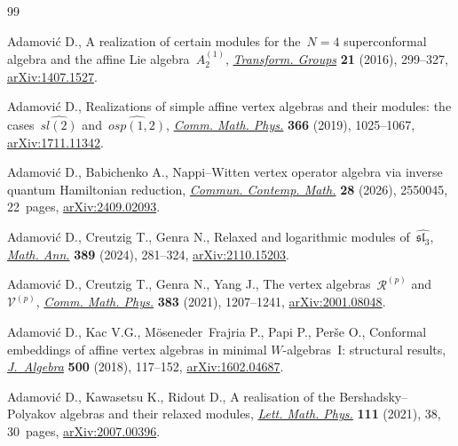 \documentclass[10pt,a4paper]{amsart}
\numberwithin{equation}{section}
\begin{document}
\begin{thebibliography}{99}
\footnotesize\itemsep=0pt

Adamovi\'c D., A realization of certain modules for the~{$N=4$} superconformal
 algebra and the affine {L}ie algebra~{$A_2^{(1)}$},
 \href{https://doi.org/10.1007/s00031-015-9349-2}{\textit{Transform. Groups}}
 \textbf{21} (2016), 299--327,
 \href{http://arxiv.org/abs/1407.1527}{arXiv:1407.1527}.

Adamovi\'c D., Realizations of simple affine vertex algebras and their modules:
 the cases~{$\widehat{sl(2)}$} and~{$\widehat{osp(1,2)}$},
 \href{https://doi.org/10.1007/s00220-019-03328-4}{\textit{Comm. Math. Phys.}}
 \textbf{366} (2019), 1025--1067,
 \href{http://arxiv.org/abs/1711.11342}{arXiv:1711.11342}.

Adamovi\'c D., Babichenko A., Nappi--{W}itten vertex operator algebra via
 inverse quantum {H}amiltonian reduction,
 \href{https://doi.org/10.1142/S0219199725500452}{\textit{Commun. Contemp.
 Math.}} \textbf{28} (2026), 2550045, 22~pages,
 \href{http://arxiv.org/abs/2409.02093}{arXiv:2409.02093}.

Adamovi\'c D., Creutzig T., Genra N., Relaxed and logarithmic modules
 of~{$\widehat{\mathfrak{sl}_3}$},
 \href{https://doi.org/10.1007/s00208-023-02634-6}{\textit{Math. Ann.}}
 \textbf{389} (2024), 281--324,
 \href{http://arxiv.org/abs/2110.15203}{arXiv:2110.15203}.

Adamovi\'c D., Creutzig T., Genra N., Yang J., The vertex algebras~{$\mathcal
 R^{(p)}$} and~{$\mathcal V^{(p)}$},
 \href{https://doi.org/10.1007/s00220-021-03950-1}{\textit{Comm. Math. Phys.}}
 \textbf{383} (2021), 1207--1241,
 \href{http://arxiv.org/abs/2001.08048}{arXiv:2001.08048}.

Adamovi\'c D., Kac V.G., M\"oseneder~Frajria P., Papi P., Per\v{s}e O.,
 Conformal embeddings of affine vertex algebras in minimal {$W$}-algebras~{I}:
 structural results,
 \href{https://doi.org/10.1016/j.jalgebra.2016.12.005}{\textit{J.~Algebra}}
 \textbf{500} (2018), 117--152,
 \href{http://arxiv.org/abs/1602.04687}{arXiv:1602.04687}.

Adamovi\'c D., Kawasetsu K., Ridout D., A realisation of the
 {B}ershadsky--{P}olyakov algebras and their relaxed modules,
 \href{https://doi.org/10.1007/s11005-021-01378-1}{\textit{Lett. Math. Phys.}}
 \textbf{111} (2021), 38, 30~pages,
 \href{http://arxiv.org/abs/2007.00396}{arXiv:2007.00396}.


\end{thebibliography}
\end{document}
